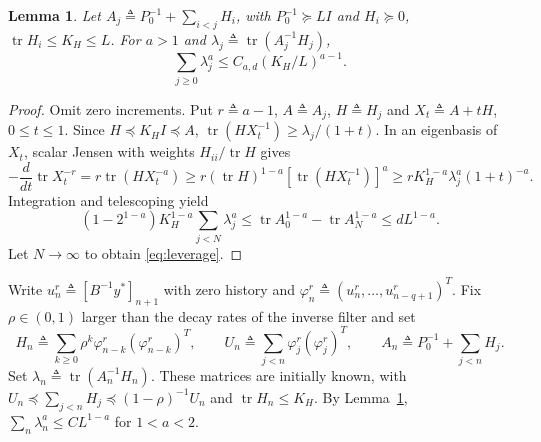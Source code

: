 \documentclass[11pt,reqno]{amsart}
\numberwithin{equation}{section}
\newtheorem{lemma}[theorem]{Lemma}
\theoremstyle{definition}
\theoremstyle{remark}
\newcommand{\ph}{\varphi}
\newcommand{\tr}{\operatorname{tr}}
\begin{document}
\begin{lemma}\label{lem:leverage}
Let $A_j\triangleq P_0^{-1}+\sum_{i<j}H_i$, with $P_0^{-1}\succeq LI$ and
$H_i\succeq0$, $\tr H_i\le K_H\le L$. For $a>1$ and
$\lambda_j\triangleq\tr(A_j^{-1}H_j)$,
\begin{equation}\label{eq:leverage}
 \sum_{j\ge0}\lambda_j^a\le C_{a,d}(K_H/L)^{a-1}.
\end{equation}
\end{lemma}
\begin{proof}
Omit zero increments. Put $r\triangleq a-1$, $A\triangleq A_j$, $H\triangleq H_j$ and
$X_t\triangleq A+tH$, $0\le t\le1$. Since $H\preceq K_HI\preceq A$,
$\tr(HX_t^{-1})\ge\lambda_j/(1+t)$. In an eigenbasis of $X_t$,
scalar Jensen with weights $H_{ii}/\tr H$ gives
\[
 -\frac{d}{dt}\tr X_t^{-r}
 =r\tr(HX_t^{-a})
 \ge r(\tr H)^{1-a}[\tr(HX_t^{-1})]^a
 \ge rK_H^{1-a}\lambda_j^a(1+t)^{-a}.
\]
Integration and telescoping yield
\[
 (1-2^{1-a})K_H^{1-a}\sum_{j<N}\lambda_j^a
 \le\tr A_0^{1-a}-\tr A_N^{1-a}\le dL^{1-a}.
\]
Let $N\to\infty$ to obtain \eqref{eq:leverage}.
\end{proof}

Write $u_n^r\triangleq[B^{-1}y^*]_{n+1}$ with zero history and $\ph_n^r\triangleq(u_n^r,\dots,u_{n-q+1}^r)^T$. Fix $\rho\in(0,1)$ larger than the decay rates of the inverse filter and set
\begin{equation*}
 H_n\triangleq\sum_{k\ge0}\rho^k\ph_{n-k}^r(\ph_{n-k}^r)^T,
 \qquad U_n\triangleq\sum_{j<n}\ph_j^r(\ph_j^r)^T,
 \qquad A_n\triangleq P_0^{-1}+\sum_{j<n}H_j.
\end{equation*}
Set $\lambda_n\triangleq\tr(A_n^{-1}H_n)$. These matrices are initially known, with $U_n\preceq\sum_{j<n}H_j\preceq(1-\rho)^{-1}U_n$ and $\tr H_n\le K_H$. By Lemma~\ref{lem:leverage}, $\sum_n\lambda_n^a\le CL^{1-a}$ for $1<a<2$.
\end{document}
